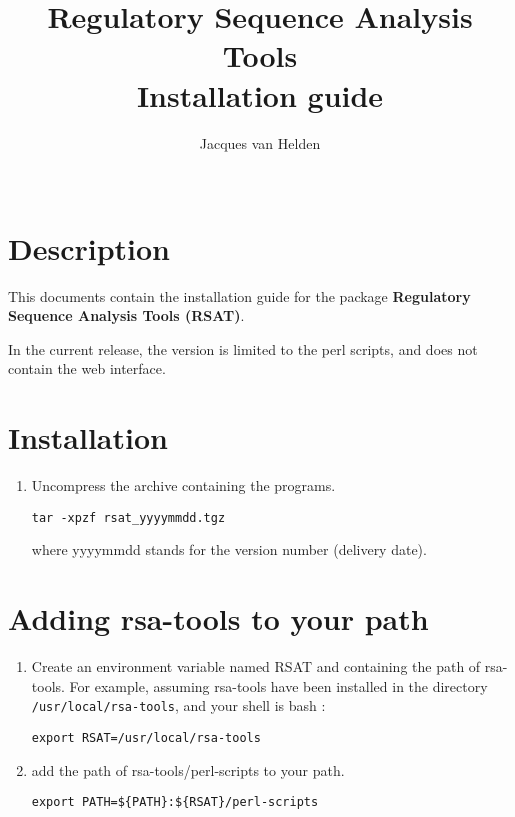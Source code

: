 \documentclass{article}
\begin{document}
\title{Regulatory Sequence Analysis Tools \\
Installation guide}

\author{
	Jacques van Helden \\
	 \\
	\scmb 
}



\maketitle


\section{Description}

This documents contain the installation guide for the package
\textbf{Regulatory Sequence Analysis Tools (RSAT)}.

In the current release, the version is limited to the perl scripts,
and does not contain the web interface.


\section{Installation}

\begin{enumerate}

\item Uncompress the archive containing the programs. 
\begin{verbatim}
tar -xpzf rsat_yyyymmdd.tgz
\end{verbatim}

where yyyymmdd stands for the version number (delivery date).

\end{enumerate}

\section{Adding rsa-tools to your path}

\begin{enumerate}

\item Create an environment variable named RSAT and containing the
path of rsa-tools. For example, assuming rsa-tools have been installed
in the directory \texttt{/usr/local/rsa-tools}, and your shell is bash
:

\begin{verbatim}
export RSAT=/usr/local/rsa-tools
\end{verbatim}

\item add the path of rsa-tools/perl-scripts to your path.
\begin{verbatim}
export PATH=${PATH}:${RSAT}/perl-scripts
\end{verbatim}

\end{enumerate}
\end{document}
